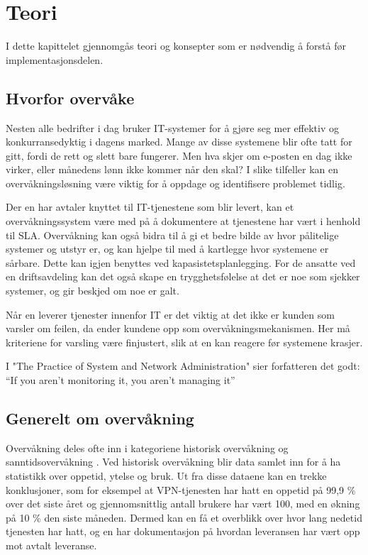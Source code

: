 \chapter{Teori}
I dette kapittelet gjennomgås teori og konsepter som er nødvendig å forstå før implementasjonsdelen.
\section{Hvorfor overvåke}
Nesten alle bedrifter i dag bruker IT-systemer for å gjøre seg mer effektiv og konkurransedyktig i dagens marked. Mange av disse systemene blir ofte tatt for gitt, fordi de rett og slett bare fungerer. Men hva skjer om e-posten en dag ikke virker, eller månedens lønn ikke kommer når den skal? I slike tilfeller kan en overvåkningsløsning være viktig for å oppdage og identifisere problemet tidlig.

Der en har avtaler knyttet til IT-tjenestene som blir levert, kan et overvåkningssystem være med på å dokumentere at tjenestene har vært i henhold til SLA. Overvåkning kan også bidra til å gi et bedre bilde av hvor pålitelige systemer og utstyr er, og kan hjelpe til med å kartlegge hvor systemene er sårbare. Dette kan igjen benyttes ved kapasistetsplanlegging. For de ansatte ved en driftsavdeling kan det også skape en trygghetsfølelse at det er noe som sjekker systemer, og gir beskjed om noe er galt.

Når en leverer tjenester innenfor IT er det viktig at det ikke er kunden som varsler om feilen, da ender kundene opp som overvåkningsmekanismen. Her må kriteriene for varsling være finjustert, slik at en kan reagere før systemene krasjer.

I "The Practice of System and Network Administration" sier forfatteren det godt: ``If you aren’t monitoring it, you aren’t managing it''

\section{Generelt om overvåkning}\label{sec:omovervakning}
Overvåkning deles ofte inn i kategoriene historisk overvåkning og sanntidsovervåkning \cite{practiceofsystemandnetwork}. 
Ved historisk overvåkning blir data samlet inn for å ha statistikk over oppetid, ytelse og bruk. Ut fra disse dataene kan en trekke konklusjoner, som for eksempel at VPN-tjenesten har hatt en oppetid på 99,9 \% over det siste året og gjennomsnittlig antall brukere har vært 100, med en økning på 10 \% den siste måneden. Dermed kan en få et overblikk over hvor lang nedetid tjenesten har hatt, og en har dokumentasjon på hvordan leveransen har vært opp mot avtalt leveranse.

